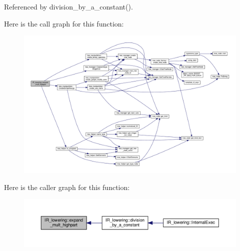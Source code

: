 Referenced by division\+\_\+by\+\_\+a\+\_\+constant().

Here is the call graph for this function\+:
\nopagebreak
\begin{figure}[H]
\begin{center}
\leavevmode
\includegraphics[width=350pt]{df/d7d/classIR__lowering_a7c9d4a3404e6c21b09acb961d905ae53_cgraph}
\end{center}
\end{figure}
Here is the caller graph for this function\+:
\nopagebreak
\begin{figure}[H]
\begin{center}
\leavevmode
\includegraphics[width=350pt]{df/d7d/classIR__lowering_a7c9d4a3404e6c21b09acb961d905ae53_icgraph}
\end{center}
\end{figure}
\mbox{\label{classIR__lowering_a8f9128221ba101fb76a525f5db6e324a}} 
